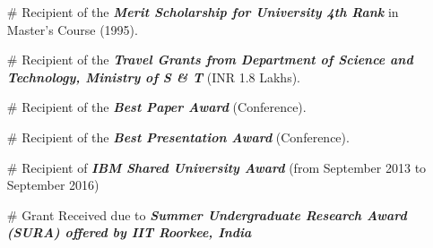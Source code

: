 \begin{itemize}
	\item[\#]
	Recipient of the \emph{\textbf{Merit Scholarship for University 4th Rank}}
	in Master's Course (1995).
	
	\item[\#]
	Recipient of the \emph{\textbf{Travel Grants from Department of Science and Technology, Ministry of S \& T}}
	(INR 1.8 Lakhs).
	
	\item[\#]
	Recipient of the \emph{\textbf{Best Paper Award}} (Conference).
	
	\item[\#]
	Recipient of the \emph{\textbf{Best Presentation Award}} (Conference).

	\item[\#]
	Recipient of \textbf{\textit{IBM Shared University Award}} (from September 2013 to September 2016)
	
	\item[\#]
	Grant Received due to \textbf{\textit{Summer Undergraduate Research Award (SURA) offered by IIT Roorkee, India}}  
	
\end{itemize}
	
